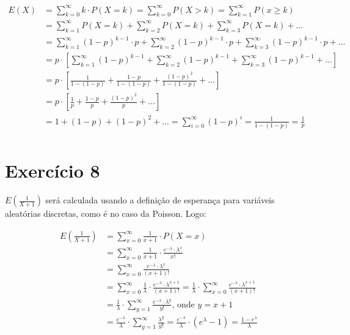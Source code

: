 \documentclass[12pt,letterpaper]{article}
\begin{document}
	\begin{equation*}
		\begin{split}
			E(X) & = \sum_{k=0}^{\infty} k \cdot P(X=k) = \sum_{k=0}^{\infty} P(X>k) = \sum_{k=1}^{\infty} P(x \geq k)\\ 
			& = \sum_{k=1}^{\infty} P(X=k) + \sum_{k=2}^{\infty} P(X=k) + \sum_{k=3}^{\infty} P(X=k) +... \\
			& = \sum_{k=1}^{\infty} (1-p)^{k-1} \cdot p + \sum_{k=2}^{\infty} (1-p)^{k-1} \cdot p + \sum_{k=3}^{\infty} (1-p)^{k-1} \cdot p + ... \\
			& = p \cdot [\sum_{k=1}^{\infty} (1-p)^{k-1} + \sum_{k=2}^{\infty} (1-p)^{k-1} + \sum_{k=3}^{\infty} (1-p)^{k-1} + ...]\\
			& = p \cdot [\frac{1}{1-(1-p)} + \frac{1-p}{1-(1-p)} + \frac{(1-p)^2}{1-(1-p)} + ...]\\
			& = p \cdot [\frac{1}{p} + \frac{1-p}{p} + \frac{(1-p)^2}{p} + ...]\\
			& = 1 + (1-p) + (1-p)^2 + ... = \sum_{i = 0}^{\infty} (1-p)^i = \frac{1}{1-(1-p)} = \frac{1}{p}\\
		\end{split}
	\end{equation*}
	
	\section*{Exercício 8}
	
	$E(\frac{1}{X+1})$ será calculada usando a definição de esperança para variáveis aleatórias discretas, como é no caso da Poisson. Logo:
	
	\begin{equation*}
		\begin{split}
			E(\frac{1}{X+1}) & = \sum_{x=0}^{\infty} \frac{1}{x+1} \cdot P(X=x)\\
			& = \sum_{x=0}^{\infty} \frac{1}{x+1} \cdot \frac{e^{-\lambda}\cdot \lambda^x}{x!} \\
			& = \sum_{x=0}^{\infty} \frac{e^{-\lambda}\cdot \lambda^x}{(x+1)!} \\
			& = \sum_{x=0}^{\infty}\frac{1}{\lambda} \cdot \frac{e^{-\lambda}\cdot \lambda^{x+1}}{(x+1)!} = \frac{1}{\lambda} \cdot \sum_{x=0}^{\infty} \frac{e^{-\lambda}\cdot \lambda^{x+1}}{(x+1)!} \\
			& = \frac{1}{\lambda} \cdot \sum_{y=1}^{\infty} \frac{e^{-\lambda}\cdot \lambda^y}{y!} \text{, onde } y = x+1 \\
			& = \frac{e^{-\lambda}}{\lambda} \cdot \sum_{y=1}^{\infty} \frac{\lambda^y}{y!} = \frac{e^{-\lambda}}{\lambda} \cdot (e^\lambda - 1) = \frac{1 - e^\lambda}{\lambda}
	\end{split}
	\end{equation*}
	
	
\end{document}
